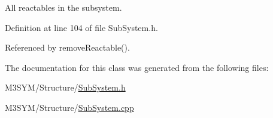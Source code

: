 All reactables in the subsystem. 



Definition at line 104 of file Sub\+System.\+h.



Referenced by remove\+Reactable().



The documentation for this class was generated from the following files\+:\begin{DoxyCompactItemize}
\item 
M3\+S\+Y\+M/\+Structure/\hyperlink{SubSystem_8h}{Sub\+System.\+h}\item 
M3\+S\+Y\+M/\+Structure/\hyperlink{SubSystem_8cpp}{Sub\+System.\+cpp}\end{DoxyCompactItemize}
